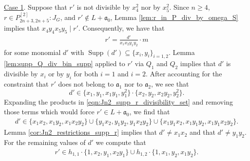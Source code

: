 \documentclass[12pt,a4paper]{amsart}
\theoremstyle{plain}
\theoremstyle{definition}
\theoremstyle{remark}
\def\a{\mathfrak{a}}
\DeclareMathOperator{\Supp}{Supp}
\newcommand{\ul}[1]{\underline{#1}}
\renewcommand{\subset}{\subseteq}
\begin{document}
\ul{Case 1}. Suppose that $r{'}$ is not divisible by $x_{4}^{2}$ nor by $x_{5}^{2}$. Since $n \geq 4$, $r \in P_{2n+3,2n+5}^{[2]}:J_{G}$, and $r' \notin L + \a_{0}$, Lemma \ref{lem:r_in_P_div_by_omega_S} implies that $x_{4}y_{4}x_{5}y_{5} \mid r'$. Consequently, we have that
\begin{align*}
    r' = \frac{d'}{x_{1}x_{2}y_{1}y_{2}} \cdot m
\end{align*}
for some monomial $d'$ with $\Supp(d') \subset \{x_{i},y_{i}\}_{i=1,2}$. Lemma \ref{lem:supp_Q_div_bin_supp} applied to $r'$ via $Q_{1}$ and $Q_{2}$ implies that $d'$ is divisible by $x_{i}$ or by $y_{i}$ for both $i = 1$ and $i = 2$. After accounting for the constraint that $r'$ does not belong to $\a_{1}$ nor to $\a_{2}$, we see that 
\begin{equation}
    \label{eqn:Jn2_supp_r_divisibility_set}
    d' \in \{x_{1},y_{1},x_{1}y_{1},y_{1}^{2}\} \cdot \{ x_{2},y_{2},x_{2}y_{2},y_{2}^{2} \}.
\end{equation}
Expanding the products in   \eqref{eqn:Jn2_supp_r_divisibility_set} and removing those terms which would force $r' \in L + \a_{0}$, we find that
\begin{align*}
    d' \in \{x_{1}x_{2},x_{1}y_{2}, x_{1}x_{2}y_{2} \} \cup \{y_{1}x_{2},y_{1}y_{2},y_{1}x_{2}y_{2}\} \cup \{x_{1}y_{1}x_{2},x_{1}y_{1}y_{2},x_{1}y_{1}x_{2}y_{2} \}.
\end{align*}
Lemma \ref{cor:Jn2_restrictions_supp_r} implies that $d' \neq x_{1}x_{2}$ and that $d' \neq y_{1}y_{2}$. For the remaining values of $d'$ we compute that\begin{align*}
    r' \in h_{1,1} \cdot \{1 , x_{2}, y_{1}, x_{2}y_{1} \} \cup h_{1,2} \cdot \{ 1, x_{1} , y_{2}, x_{1}y_{2} \}.
\end{align*}
\end{document}
